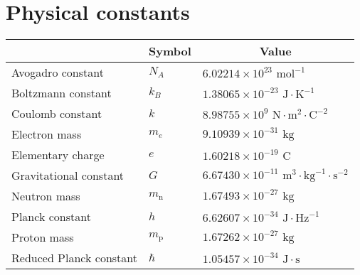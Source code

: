 \documentclass[../main.tex]{subfiles}
\begin{document}
\section{Physical constants}
\begin{center}
    \begin{tabular}{|l|l|l|}
        \hline
        \rowcolor{gray!20}
        \multicolumn{1}{|c|}{\bfseries Quantity} & \multicolumn{1}{c|}{\bfseries Symbol} & \multicolumn{1}{c|}{\bfseries Value}                                     \\
        \hline
        \hline
        Avogadro constant                        & $N_A$                                 & $6.02214\times 10^{23}\text{ mol}^{-1}$                                  \\
        \hline
        Boltzmann constant                       & $k_B$                                 & $1.38065\times 10^{-23}\text{ J}\cdot\text{K}^{-1}$                      \\
        \hline
        Coulomb constant                         & $k$                                   & $8.98755\times 10^9\text{ N}\cdot\text{m}^2\cdot\text{C}^{-2}$           \\
        \hline
        Electron mass                            & $m_e$                                 & $9.10939\times 10^{-31}\text{ kg}$                                       \\
        \hline
        Elementary charge                        & $e$                                   & $1.60218\times 10^{-19}\text{ C}$                                        \\
        \hline
        Gravitational constant                   & $G$                                   & $6.67430\times 10^{-11}\text{ m}^3\cdot\text{kg}^{-1}\cdot\text{s}^{-2}$ \\
        \hline
        Neutron mass                             & $m_\text{n}$                          & $1.67493\times 10^{-27}\text{ kg}$                                       \\
        \hline
        Planck constant                          & $h$                                   & $6.62607\times 10^{-34}\text{ J}\cdot\text{Hz}^{-1}$                     \\
        \hline
        Proton mass                              & $m_\text{p}$                          & $1.67262\times 10^{-27}\text{ kg}$                                       \\
        \hline
        Reduced Planck constant                  & $\hbar$                               & $1.05457\times 10^{-34}\text{ J}\cdot\text{s}$                           \\

\end{tabular}
\end{center}
\end{document}

